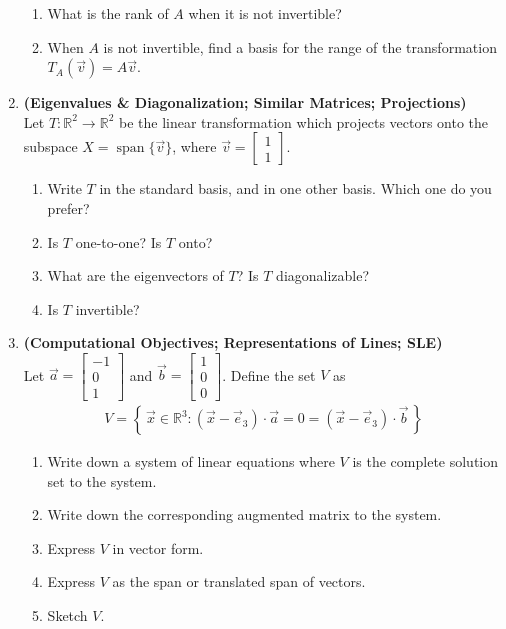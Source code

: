 \documentclass[red]{tutorial}
\newcommand{\R}{\mathbb{R}}
\newcommand{\smat}[1]{\left[\begin{smallmatrix} #1 %
\end{smallmatrix}\right]}
\DeclareMathOperator{\Span} {span}
\theoremstyle{definition}
\theoremstyle{theorem}
\begin{document}
\begin{tutorial}
\begin{enumerate}
\begin{enumerate}
        \item What is the rank of $A$ when it is not invertible?
        \item When $A$ is not invertible, find a basis for the range of the
          transformation $T_A(\vec v) = A\vec v$.
      \end{enumerate}
    \item \textbf{(Eigenvalues \& Diagonalization; Similar Matrices;
      Projections)}\\
      Let $T\colon\R^2\to\R^2$ be the linear transformation which
      projects vectors onto the subspace $X=\Span\{\vec v\}$,
      where $\vec v = \smat{1\\1}$.
      \begin{enumerate}
        \item \label{q:standard_basis}
          Write $T$ in the standard basis, and in one other 
          basis. Which one do you prefer?
        \item Is $T$ one-to-one? Is $T$ onto?
        \item What are the eigenvectors of $T$? Is $T$ diagonalizable?
        \item Is $T$ invertible?
      \end{enumerate}
    \item \textbf{(Computational Objectives; Representations of Lines;
      SLE)}\\
      Let $\vec a = \smat{-1\\0\\1}$ and $\vec b = \smat{1\\0\\0}$.
      Define the set $V$ as
      \begin{align*}
        V = \left\{\,\vec x\in \R^3 :
        (\vec x - \vec e_3)\cdot \vec a = 0%
        = (\vec x - \vec e_3)\cdot \vec b \,\right\}
      \end{align*}
      \begin{enumerate}
        \item Write down a system of linear equations where
              $V$ is the complete solution set to the system.
        \item Write down the corresponding augmented matrix 
          to the system.
        \item Express $V$ in vector form.
        \item Express $V$ as the span or translated span of
              vectors.
        \item Sketch $V$.
      \end{enumerate}
  \end{enumerate}
\end{tutorial}
\end{document}
